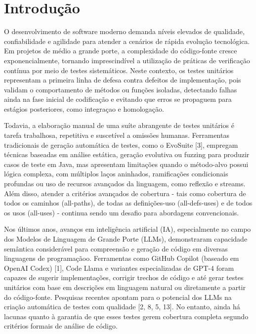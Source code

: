 \section{Introdução}
O desenvolvimento de software moderno demanda níveis elevados de qualidade, confiabilidade e agilidade para atender a cenários de rápida evolução tecnológica. Em projetos de médio a grande porte, a complexidade do código-fonte cresce exponencialmente, tornando imprescindível a utilização de práticas de verificação contínua por meio de testes sistemáticos. Neste contexto, os testes unitários representam a primeira linha de defesa contra defeitos de implementação, pois validam o comportamento de métodos ou funções isoladas, detectando falhas ainda na fase inicial de codificação e evitando que erros se propaguem para estágios posteriores, como integraçao e homologação.

Todavia, a elaboração manual de uma suíte abrangente de testes unitários é tarefa trabalhosa, repetitiva e suscetível a omissões humanas. Ferramentas tradicionais de geração automática de testes, como o EvoSuite [3], empregam técnicas baseadas em análise estática, geração evolutiva ou fuzzing para produzir casos de teste em Java, mas apresentam limitações quando o método-alvo possui lógica complexa, com múltiplos laços aninhados, ramificações condicionais profundas ou uso de recursos avançados da linguagem, como reflexão e streams. Além disso, atender a critérios avançados de cobertura - tais como cobertura de todos os caminhos (all-paths), de todas as definições-uso (all-defs-uses) e de todos os usos (all-uses) - continua sendo um desafio para abordagens convencionais.

Nos últimos anos, avanços em inteligência artificial (IA), especialmente no campo dos Modelos de Linguagem de Grande Porte (LLMs), demonstraram capacidade semântica considerável para compreensão e geração de código em diversas linguagens de programaçãoo. Ferramentas como GitHub Copilot (baseado em OpenAI Codex) [1], Code Llama e variantes especializadas de GPT-4 foram capazes de sugerir implementações, corrigir trechos de código e até gerar testes unitários com base em descrições em linguagem natural ou diretamente a partir do código-fonte. Pesquisas recentes apontam para o potencial dos LLMs na criação automática de testes com qualidade [2, 8, 5, 13]. No entanto, ainda há lacunas quanto à garantia de que esses testes gerem cobertura completa segundo critérios formais de análise de código.

